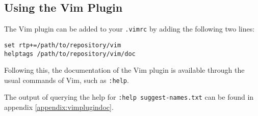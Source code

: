 \subsection{Using the Vim Plugin}
The Vim \cite{vim} plugin can be added to your \lstinline|.vimrc| by adding the
following two lines:

\begin{lstlisting}
set rtp+=/path/to/repository/vim
helptags /path/to/repository/vim/doc
\end{lstlisting}

Following this, the documentation of the Vim plugin is available through the
usual commands of Vim, such as \lstinline|:help|.

The output of querying the help for \lstinline|:help suggest-names.txt| can be
found in appendix \ref{appendix:vimplugindoc}.
